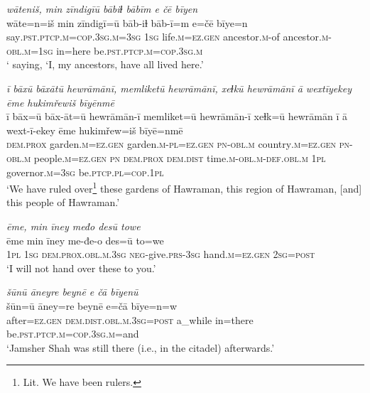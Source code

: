 \ea \label{DP.20}
\textit{wāteniš, min zīndigīū bābiɫ bābīm e čē bīyen} \\ 
\gll wāte=n=iš min zīndigī=ū bāb-iɫ bāb-ī=m e=čē bīye=n \\ 
 say\textsc{.pst}\textsc{.ptcp}\textsc{.m}\textsc{=cop}\textsc{.3sg}\textsc{.m}\textsc{=3sg} \textsc{1sg} life\textsc{.m}\textsc{=ez}\textsc{.gen} ancestor\textsc{.m}-of ancestor\textsc{.m}\textsc{-obl}\textsc{.m}\textsc{=1sg} in=here be\textsc{.pst}\textsc{.ptcp}\textsc{.m}\textsc{=cop}\textsc{.3sg}\textsc{.m} \\ 
\glt ` saying, ‘I, my ancestors, have all lived here.'
\z 
 
\ea \label{DP.21}
\textit{ī bāxū bāxātū hewrāmānī, memliketū hewrāmānī, xeɫkū hewrāmānī ā wextīyekey ēme hukimřewiš bīyēnmē} \\ 
\gll ī bāx=ū bāx-āt=ū hewrāmān-ī memliket=ū hewrāmān-ī xeɫk=ū hewrāmān ī ā wext-ī-ekey ēme hukimřew=iš bīyē=nmē \\ 
 \textsc{dem.prox} garden\textsc{.m}\textsc{=ez}\textsc{.gen} garden\textsc{.m}\textsc{-pl}\textsc{=ez}\textsc{.gen} \textsc{pn}\textsc{-obl}\textsc{.m} country\textsc{.m}\textsc{=ez}\textsc{.gen} \textsc{pn}\textsc{-obl}\textsc{.m} people\textsc{.m}\textsc{=ez}\textsc{.gen} \textsc{pn} \textsc{dem.prox} \textsc{dem.dist} time\textsc{.m}\textsc{-obl}\textsc{.m}\textsc{-def}\textsc{.obl}\textsc{.m} \textsc{1pl} governor\textsc{.m}\textsc{=3sg} be\textsc{.ptcp}\textsc{.pl}\textsc{=cop}\textsc{.1pl} \\ 
\glt `We have ruled over\footnote{Lit. We have been rulers.} these gardens of Hawraman, this region of Hawraman, [and] this people of Hawraman.'
\z 
 
\ea \label{DP.22}
\textit{ēme, min īney međo desū towe} \\ 
\gll ēme min īney me-đe-o des=ū to=we \\ 
 \textsc{1pl} \textsc{1sg} \textsc{dem.prox}\textsc{.obl}\textsc{.m}\textsc{.3sg} \textsc{neg-}give\textsc{.prs}\textsc{-3sg} hand\textsc{.m}\textsc{=ez}\textsc{.gen} \textsc{2sg}\textsc{=\textsc{post}} \\ 
\glt `I will not hand over these to you.'
\z 
 
\ea \label{DP.25}
\textit{šūnū āneyre beynē e čā bīyenū} \\ 
\gll šūn=ū āney=re beynē e=čā bīye=n=w \\ 
 after\textsc{=ez}\textsc{.gen} \textsc{dem.dist}\textsc{.obl}\textsc{.m}\textsc{.3sg}\textsc{=\textsc{post}} a\_while in=there be\textsc{.pst}\textsc{.ptcp}\textsc{.m}\textsc{=cop}\textsc{.3sg}\textsc{.m}=and \\ 
\glt `Jamsher Shah was still there (i.e., in the citadel) afterwards.'
\z 
 
